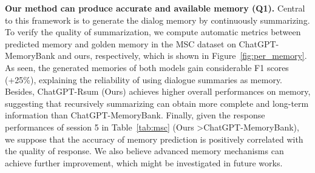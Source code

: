 \documentclass[authoryear,preprint,review,12pt]{elsarticle}
\begin{document}
 \textbf{Our method can produce accurate and available memory (Q1).}
Central to this framework is to generate the dialog memory by continuously summarizing. To verify the quality of summarization, we compute automatic metrics between predicted memory and golden memory in the MSC dataset on ChatGPT-MemoryBank and ours, respectively, which is shown in Figure~\ref{fig:per_memory}. As seen, the generated memories of both models gain considerable F1 scores (+25\%), explaining the reliability of using dialogue summaries as memory. Besides, ChatGPT-Rsum (Ours) achieves higher overall performances on memory, suggesting that recursively summarizing can obtain more complete and long-term information than ChatGPT-MemoryBank.
Finally, given the response performances of session 5 in Table~\ref{tab:msc} (Ours \textgreater ChatGPT-MemoryBank), we suppose that the accuracy of memory prediction is positively correlated with the quality of response. We also believe advanced memory mechanisms can achieve further improvement, which might be investigated in future works.
\end{document}
